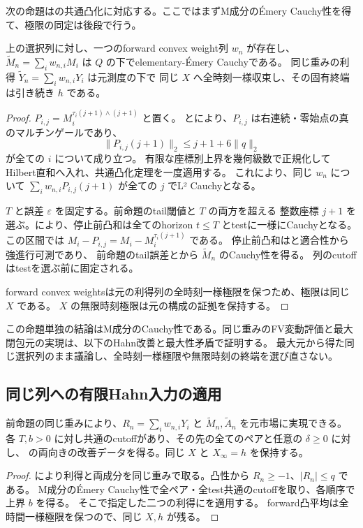 次の命題は\cite[Lemma 4.10]{DS}の共通凸化に対応する。ここではまずM成分のÉmery Cauchy性を得て、極限の同定は後段で行う。

\begin{proposition}[同じ選択列のマルチンゲール成分の共通凸化]\label{prop:martingale-convexification}
上の選択列に対し、一つのforward convex weight列 $w_n$ が存在し、
$\widetilde M_n=\sum_iw_{n,i}M_i$ は $Q$ の下でelementary-Émery Cauchyである。
同じ重みの利得 $\widetilde Y_n=\sum_iw_{n,i}Y_i$ は元測度の下で
同じ $X$ へ全時刻一様収束し、その固有終端は引き続き $h$ である。
\end{proposition}
\begin{proof}
$P_{i,j}=M_i^{\tau_i(j+1)\wedge(j+1)}$ と置く。
とにより、$P_{i,j}$ は右連続・零始点の真のマルチンゲールであり、
\[
 \|P_{i,j}(j+1)\|_2\leq j+1+6\|q\|_2
\]
が全ての $i$ について成り立つ。
有限な座標別上界を幾何級数で正規化してHilbert直和へ入れ、共通凸化定理を一度適用する。
これにより、同じ $w_n$ について $\sum_iw_{n,i}P_{i,j}(j+1)$ が全ての $j$ でL² Cauchyとなる。

$T$ と誤差 $\varepsilon$ を固定する。前命題のtail閾値と $T$ の両方を超える
整数座標 $j+1$ を選ぶ。により、停止前凸和は全てのhorizon $t\leq T$ とtestに一様にCauchyとなる。
この区間では $M_i-P_{i,j}=M_i-M_i^{\tau_i(j+1)}$ である。
停止前凸和はと適合性から強進行可測であり、
前命題のtail誤差とから $\widetilde M_n$ のCauchy性を得る。
列のcutoffはtestを選ぶ前に固定される。

forward convex weightsは元の利得列の全時刻一様極限を保つため、極限は同じ $X$ である。
$X$ の無限時刻極限は元の構成の証拠を保持する。
\end{proof}

この命題単独の結論はM成分のCauchy性である。同じ重みのFV変動評価と最大閉包元の実現は、以下のHahn改善と最大性矛盾で証明する。
最大元から得た同じ選択列のまま議論し、全時刻一様極限や無限時刻の終端を選び直さない。

\subsection{同じ列への有限Hahn入力の適用}
\begin{proposition}[ペアに共通するHahn改善データ]\label{prop:sequence-hahn}
前命題の同じ重みにより、$R_n=\sum_iw_{n,i}Y_i$ と
$\widetilde M_n,\widetilde A_n$ を元市場に実現できる。
各 $T,b>0$ に対し共通のcutoffがあり、その先の全てのペアと任意の $\delta\geq0$ に対し、
の両向きの改善データを得る。同じ $X$ と $X_\infty=h$ を保持する。
\end{proposition}
\begin{proof}
により利得と両成分を同じ重みで取る。凸性から $R_n\geq-1$、$|R_n|\leq q$ である。
M成分のÉmery Cauchy性で全ペア・全test共通のcutoffを取り、各順序で上界 $b$ を得る。
そこで指定した二つの利得にを適用する。
forward凸平均は全時間一様極限を保つので、同じ $X,h$ が残る。
\end{proof}

